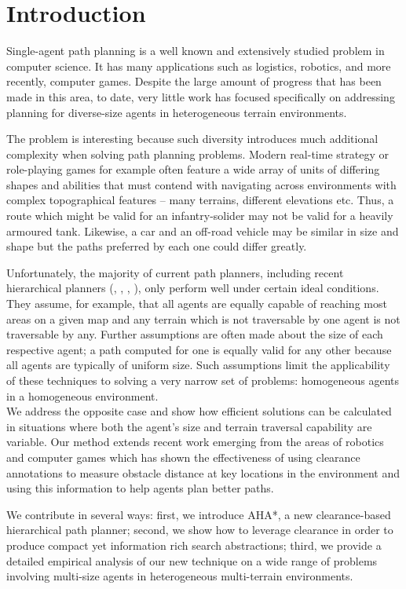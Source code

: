 \section{Introduction}
Single-agent path planning is a well known and extensively studied problem in computer science.
It has many applications such as logistics, robotics, and more recently, computer games. 
Despite the large amount of progress that has been made in this area, to date, very little work has focused specifically on addressing planning for diverse-size agents in heterogeneous terrain environments. 
\par \indent
The problem is interesting because such diversity introduces much additional complexity when solving path planning problems.
Modern real-time strategy or role-playing games for example often feature a wide array of units of differing shapes and abilities that must contend with navigating across environments with complex topographical features -- many terrains, different elevations etc. 
Thus, a route which might be valid for an infantry-solider may not be valid for a heavily armoured tank. 
Likewise, a car and an off-road vehicle may be similar in size and shape but the paths preferred by each one could differ greatly. 
\par \indent
Unfortunately, the majority of current path planners, including recent hierarchical planners (\cite{botea04}, \cite{sturtevant05}, \cite{demyen07}, \cite{geraerts07}), only perform well under certain ideal conditions. 
They assume, for example, that all agents are equally capable of reaching most areas on a given map and any terrain which is not traversable by one agent is not traversable by any. 
Further assumptions are often made about the size of each respective agent; a path computed for one is equally valid for any other because all agents are typically of uniform size. 
Such assumptions limit the applicability of these techniques to solving a very narrow set of problems: homogeneous agents in a homogeneous environment. \\
We address the opposite case and show how efficient solutions can be calculated in situations where both the agent's size and terrain traversal capability are variable. 
Our method extends recent work emerging from the areas of robotics and computer games which has shown the effectiveness of using clearance annotations to measure obstacle distance at key locations in the environment and using this information to help agents plan better paths. 
\par \indent
We contribute in several ways: first, we introduce AHA*, a new clearance-based hierarchical path planner; second, we show how to leverage clearance in order to produce compact yet information rich search abstractions; third, we provide a detailed empirical analysis of our new technique on a wide range of problems involving multi-size agents in heterogeneous multi-terrain environments.

